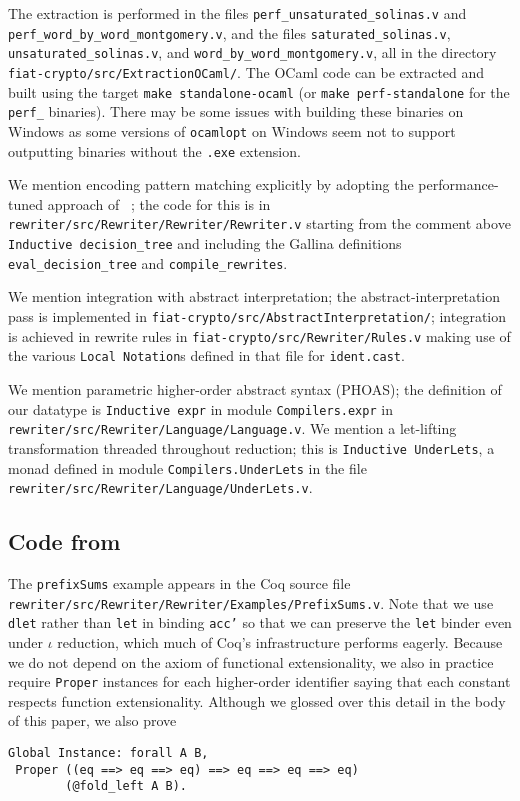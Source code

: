 \documentclass[a4paper,USenglish,cleveref,autoref,thm-restate]{lipics-v2021}
\newcommand{\citet}[1]{\usebibentry{#1}{citet}~\cite{#1}}
\begin{document}
\begin{minipage}[t][1cm]{\textwidth}
\begin{itemize}
    The extraction is performed in the files \texttt{perf\_unsaturated\_solinas.v} and \texttt{perf\_word\_by\_word\_montgomery.v}, and the files \texttt{saturated\_solinas.v}, \texttt{unsaturated\_solinas.v}, and \texttt{word\_by\_word\_montgomery.v}, all in the directory \texttt{fiat-crypto/src/ExtractionOCaml/}.
    The OCaml code can be extracted and built using the target \texttt{make standalone-ocaml} (or \texttt{make perf-standalone} for the \texttt{perf\_} binaries).
    There may be some issues with building these binaries on Windows as some versions of \texttt{ocamlopt} on Windows seem not to support outputting binaries without the \texttt{.exe} extension.
\end{itemize}

We mention encoding pattern matching explicitly by adopting the performance-tuned approach of \citet{maranget2008compiling}; the code for this is in \texttt{rewriter/src/Rewriter/Rewriter/Rewriter.v} starting from the comment above \texttt{Inductive decision_tree} and including the Gallina definitions \texttt{eval_decision_tree} and \texttt{compile_rewrites}.

We mention integration with abstract interpretation; the abstract-interpretation pass is implemented in \texttt{fiat-crypto/src/AbstractInterpretation/}; integration is achieved in rewrite rules in \texttt{fiat-crypto/src/Rewriter/Rules.v} making use of the various \texttt{Local Notation}s defined in that file for \texttt{ident.cast}.

We mention parametric higher-order abstract syntax (PHOAS); the definition of our datatype is \texttt{Inductive expr} in module \texttt{Compilers.expr} in \texttt{rewriter/src/Rewriter/Language/Language.v}.
We mention a let-lifting transformation threaded throughout reduction; this is \texttt{Inductive UnderLets}, a monad defined in module \texttt{Compilers.UnderLets} in the file \texttt{rewriter/src/Rewriter/Language/UnderLets.v}.

\subsection{Code from }

The \texttt{prefixSums} example appears in the Coq source file \texttt{rewriter/src/Rewriter/Rewriter/Examples/PrefixSums.v}.
Note that we use \texttt{dlet} rather than \texttt{let} in binding \texttt{acc'} so that we can preserve the \texttt{let} binder even under $\iota$ reduction, which much of Coq's infrastructure performs eagerly.
Because we do not depend on the axiom of functional extensionality, we also in practice require \texttt{Proper} instances for each higher-order identifier saying that each constant respects function extensionality.
Although we glossed over this detail in the body of this paper, we also prove
\begin{verbatim}
Global Instance: forall A B,
 Proper ((eq ==> eq ==> eq) ==> eq ==> eq ==> eq)
        (@fold_left A B).
\end{verbatim}


\end{minipage}
\end{document}

